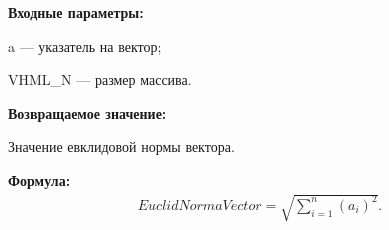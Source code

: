 \textbf{Входные параметры:}  

 a --- указатель на вектор;
 
 VHML\_N ---  размер массива.
 
\textbf{Возвращаемое значение:}

 Значение евклидовой нормы вектора.

\textbf{Формула:}
\begin{eqnarray*}
EuclidNormaVector=\sqrt{\sum_{i=1}^{n} {\left( a_i\right)}^2 }.
\end{eqnarray*}
